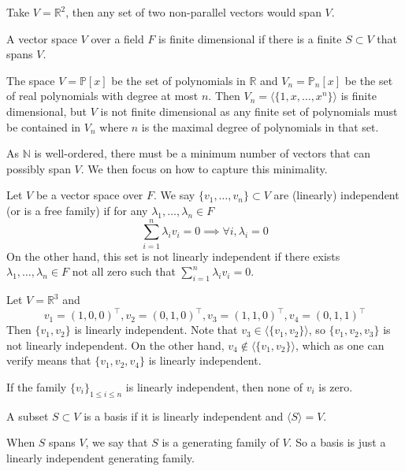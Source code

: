 \begin{example}
    Take $V=\mathbb R^2$, then any set of two non-parallel vectors would span $V$.
\end{example}
\begin{definition}
    A vector space $V$ over a field $F$ is finite dimensional if there is a finite $S\subset V$ that spans $V$.
\end{definition}
\begin{example}
    The space $V=\mathbb P[x]$ be the set of polynomials in $\mathbb R$ and $V_n=\mathbb P_n[x]$ be the set of real polynomials with degree at most $n$.
    Then $V_n=\langle\{1,x,\ldots,x^n\}\rangle$ is finite dimensional, but $V$ is not finite dimensional as any finite set of polynomials must be contained in $V_n$ where $n$ is the maximal degree of polynomials in that set.
\end{example}
As $\mathbb N$ is well-ordered, there must be a minimum number of vectors that can possibly span $V$.
We then focus on how to capture this minimality.
\begin{definition}
    Let $V$ be a vector space over $F$.
    We say $\{v_1,\ldots,v_n\}\subset V$ are (linearly) independent (or is a free family) if for any $\lambda_1,\ldots,\lambda_n\in F$
    $$\sum_{i=1}^n\lambda_iv_i=0\implies\forall i,\lambda_i=0$$
    On the other hand, this set is not linearly independent if there exists $\lambda_1,\ldots,\lambda_n\in F$ not all zero such that $\sum_{i=1}^n\lambda_iv_i=0$.
\end{definition}
\begin{example}
    Let $V=\mathbb R^3$ and
    $$v_1=(1,0,0)^\top,v_2=(0,1,0)^\top,v_3=(1,1,0)^\top,v_4=(0,1,1)^\top$$
    Then $\{v_1,v_2\}$ is linearly independent.
    Note that $v_3\in\langle\{v_1,v_2\}\rangle$, so $\{v_1,v_2,v_3\}$ is not linearly independent.
    On the other hand, $v_4\notin\langle\{v_1,v_2\}\rangle$, which as one can verify means that $\{v_1,v_2,v_4\}$ is linearly independent.
\end{example}
\begin{remark}
    If the family $\{v_i\}_{1\le i\le n}$ is linearly independent, then none of $v_i$ is zero.
\end{remark}
\begin{definition}[Basis]
    A subset $S\subset V$ is a basis if it is linearly independent and $\langle S\rangle=V$.
\end{definition}
\begin{remark}
    When $S$ spans $V$, we say that $S$ is a generating family of $V$.
    So a basis is just a linearly independent generating family.
\end{remark}
